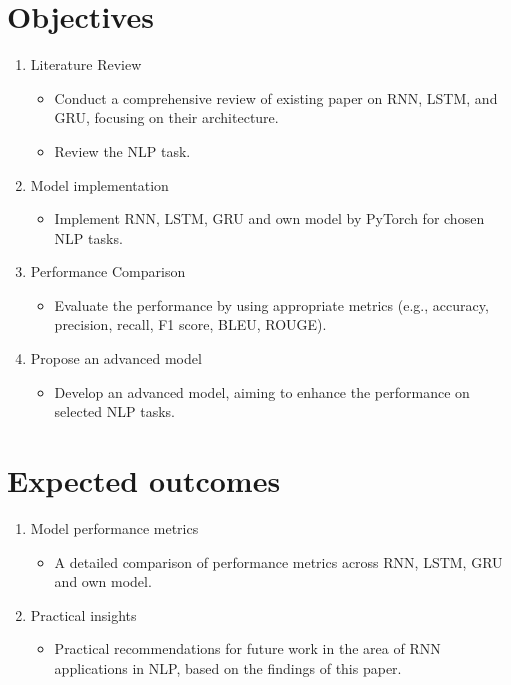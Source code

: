 \documentclass[12pt,a4paper]{article}
\begin{document}
\section{Objectives}
\begin{enumerate}
    \item Literature Review
    \begin{itemize}
        \item Conduct a comprehensive review of existing paper on RNN, LSTM, and GRU, focusing on their architecture.
        \item Review the NLP task.
    \end{itemize}

    \item Model implementation
    \begin{itemize}
        \item Implement RNN, LSTM, GRU and own model by PyTorch for chosen NLP tasks.
    \end{itemize}

    \item Performance Comparison
    \begin{itemize}
        \item Evaluate the performance by using appropriate metrics (e.g., accuracy, precision, recall, F1 score, BLEU, ROUGE).
    \end{itemize}

    \item Propose an advanced model
    \begin{itemize}
        \item Develop an advanced model, aiming to enhance the performance on selected NLP tasks. 
    \end{itemize}
\end{enumerate}

\section{Expected outcomes}
\begin{enumerate}
    \item Model performance metrics
    \begin{itemize}
        \item A detailed comparison of performance metrics across RNN, LSTM, GRU and own model. 
    \end{itemize}

    \item Practical insights
    \begin{itemize}
        \item Practical recommendations for future work in the area of RNN applications in NLP, based on the findings of this paper. 
    \end{itemize}
\end{enumerate}
\end{document}
